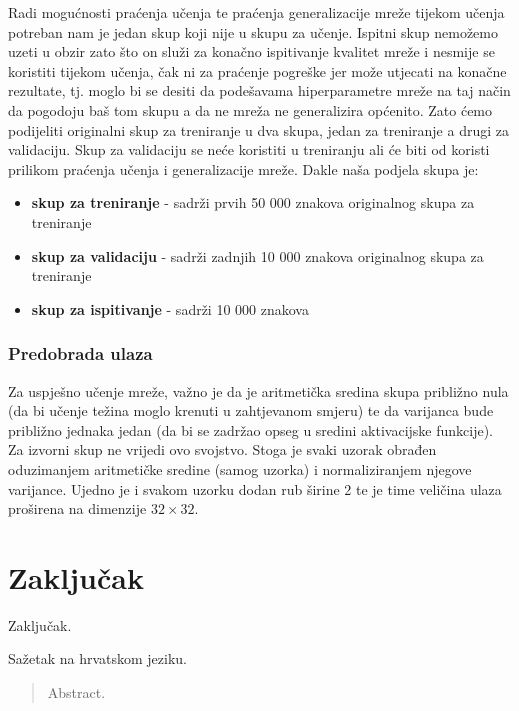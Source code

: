 \documentclass[times, utf8, zavrsni]{fer}
\begin{document}
Radi mogućnosti praćenja učenja te praćenja generalizacije mreže tijekom učenja potreban nam je jedan skup koji nije u skupu za učenje. Ispitni skup nemožemo uzeti u obzir zato što on služi za konačno ispitivanje kvalitet mreže i nesmije se koristiti tijekom učenja, čak ni za praćenje pogreške jer može utjecati na konačne rezultate, tj. moglo bi se desiti da podešavama hiperparametre mreže na taj način da pogodoju baš tom skupu a da ne mreža ne generalizira općenito. Zato ćemo podijeliti originalni skup za treniranje u dva skupa, jedan za treniranje a drugi za validaciju. Skup za validaciju se neće koristiti u treniranju ali će biti od koristi prilikom praćenja učenja i generalizacije mreže. Dakle naša podjela skupa je:
\begin{itemize}
\item \textbf{skup za treniranje} - sadrži prvih 50 000 znakova originalnog skupa za treniranje
\item \textbf{skup za validaciju} - sadrži zadnjih 10 000 znakova originalnog skupa za treniranje
\item \textbf{skup za ispitivanje} - sadrži 10 000 znakova
\end{itemize}

\subsection{Predobrada ulaza}
Za uspješno učenje mreže, važno je da je aritmetička sredina skupa približno nula (da
bi učenje težina moglo krenuti u zahtjevanom smjeru) te da varijanca bude
približno jednaka jedan (da bi se zadržao opseg u sredini aktivacijske funkcije).
Za izvorni skup ne vrijedi ovo svojstvo. Stoga je svaki uzorak obrađen oduzimanjem 
aritmetičke sredine (samog uzorka) i normaliziranjem njegove varijance. Ujedno je i svakom uzorku dodan rub širine 2 te je time veličina ulaza proširena na dimenzije $32 \times 32$.


\chapter{Zaključak}
Zaključak.




\begin{sazetak}
Sažetak na hrvatskom jeziku.

\end{sazetak}

\begin{abstract}
Abstract.

\end{abstract}
\end{document}
